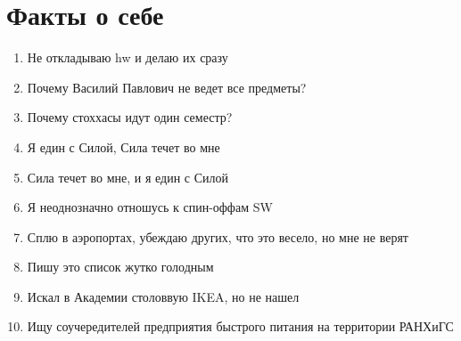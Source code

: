 \documentclass[12pt,a4paper]{article}
\begin{document}
  \section{Факты о себе}
  
  \begin{enumerate}
   \item Не откладываю hw и делаю их сразу
   \item Почему Василий Павлович не ведет все предметы?
   \item Почему стоххасы идут один семестр?
   \item Я един с Силой, Сила течет во мне
   \item Сила течет во мне, и я един с Силой
   \item Я неоднозначно отношусь к спин-оффам SW
   \item Сплю в аэропортах, убеждаю других, что это весело, но мне не верят
   \item Пишу это список жутко голодным
   \item Искал в Академии столоввую IKEA, но не нашел
   \item Ищу соучередителей предприятия быстрого питания на территории РАНХиГС
  \end{enumerate}
\end{document}
